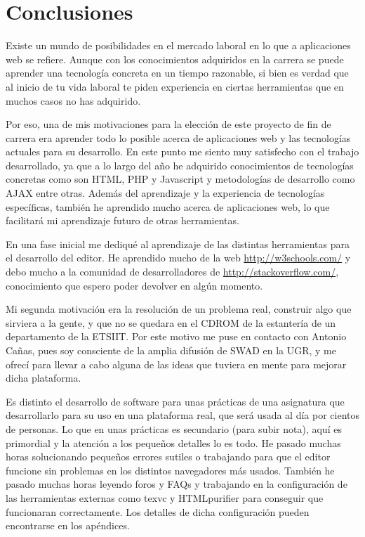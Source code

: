 \chapter{Conclusiones}

Existe un mundo de posibilidades en el mercado laboral en lo que a aplicaciones web se refiere. Aunque con los conocimientos adquiridos en la carrera se puede aprender una tecnología concreta en un tiempo razonable, si bien es verdad que al inicio de tu vida laboral te piden experiencia en ciertas herramientas que en muchos casos no has adquirido.

Por eso, una de mis motivaciones para la elección de este proyecto de fin de carrera era aprender todo lo posible acerca de aplicaciones web y las tecnologías actuales para su desarrollo. En este punto me siento muy satisfecho con el trabajo desarrollado, ya que a lo largo del año he adquirido conocimientos de tecnologías concretas como son HTML, PHP y Javascript y metodologías de desarrollo como AJAX entre otras. Además del aprendizaje y la experiencia de tecnologías específicas, también he aprendido mucho acerca de aplicaciones web, lo que facilitará mi aprendizaje futuro de otras herramientas. 

En una fase inicial me dediqué al aprendizaje de las distintas herramientas para el desarrollo del editor. He aprendido mucho de la web \url{http://w3schools.com/} y debo mucho a la comunidad de desarrolladores de \url{http://stackoverflow.com/}, conocimiento que espero poder devolver en algún momento.

Mi segunda motivación era la resolución de un problema real, construir algo que sirviera a la gente, y que no se quedara en el CDROM de la estantería de un departamento de la ETSIIT. Por este motivo me puse en contacto con Antonio Cañas, pues soy consciente de la amplia difusión de SWAD en la UGR, y me ofrecí para llevar a cabo alguna de las ideas que tuviera en mente para mejorar dicha plataforma.

Es distinto el desarrollo de software para unas prácticas de una asignatura que desarrollarlo para su uso en una plataforma real, que será usada al día por cientos de personas. Lo que en unas prácticas es secundario (para subir nota), aquí es primordial y la atención a los pequeños detalles lo es todo. He pasado muchas horas solucionando pequeños errores sutiles o trabajando para que el editor funcione sin problemas en los distintos navegadores más usados. También he pasado muchas horas leyendo foros y FAQs y trabajando en la configuración de las herramientas externas como texvc y HTMLpurifier para conseguir que funcionaran correctamente. Los detalles de dicha configuración pueden encontrarse en los apéndices.  

